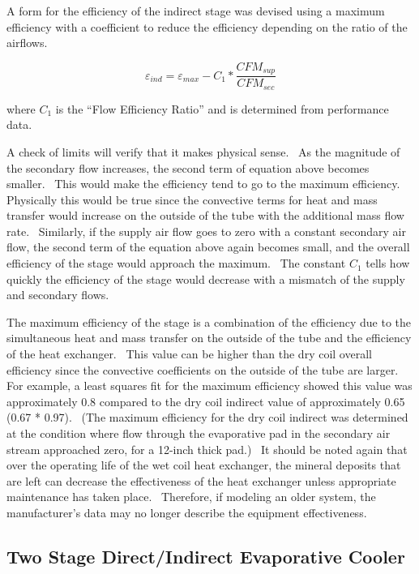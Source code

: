 A form for the efficiency of the indirect stage was devised using a maximum efficiency with a coefficient to reduce the efficiency depending on the ratio of the airflows.

\begin{equation}
{\varepsilon_{ind}} = {\varepsilon_{max}} - C_1 * \frac{CFM_{sup}}{CFM_{sec}}
\end{equation}

where \(C_1\) is the ``Flow Efficiency Ratio'' and is determined from performance data.

A check of limits will verify that it makes physical sense.~ As the magnitude of the secondary flow increases, the second term of equation above becomes smaller.~ This would make the efficiency tend to go to the maximum efficiency.~ Physically this would be true since the convective terms for heat and mass transfer would increase on the outside of the tube with the additional mass flow rate.~ Similarly, if the supply air flow goes to zero with a constant secondary air flow, the second term of the equation above again becomes small, and the overall efficiency of the stage would approach the maximum.~ The constant \(C_1\) tells how quickly the efficiency of the stage would decrease with a mismatch of the supply and secondary flows.

The maximum efficiency of the stage is a combination of the efficiency due to the simultaneous heat and mass transfer on the outside of the tube and the efficiency of the heat exchanger.~ This value can be higher than the dry coil overall efficiency since the convective coefficients on the outside of the tube are larger.~ For example, a least squares fit for the maximum efficiency showed this value was approximately 0.8 compared to the dry coil indirect value of approximately 0.65 (0.67 * 0.97).~ (The maximum efficiency for the dry coil indirect was determined at the condition where flow through the evaporative pad in the secondary air stream approached zero, for a 12-inch thick pad.)~ It should be noted again that over the operating life of the wet coil heat exchanger, the mineral deposits that are left can decrease the effectiveness of the heat exchanger unless appropriate maintenance has taken place.~ Therefore, if modeling an older system, the manufacturer's data may no longer describe the equipment effectiveness.

\subsection{Two Stage Direct/Indirect Evaporative Cooler}\label{two-stage-directindirect-evaporative-cooler}

